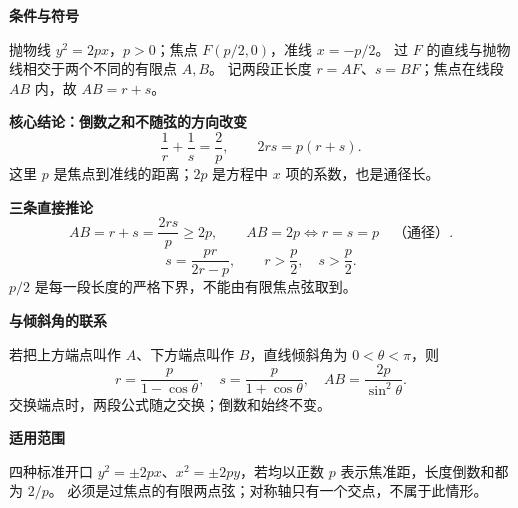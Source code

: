 \begin{statementbox}
\textbf{\textcolor{CStatement}{条件与符号}}

抛物线 $y^2=2px$，$p>0$；焦点 $F(p/2,0)$，准线 $x=-p/2$。
过 $F$ 的直线与抛物线相交于两个不同的有限点 $A,B$。
记两段正长度 $r=AF$、$s=BF$；焦点在线段 $AB$ 内，故 $AB=r+s$。

\par\medskip
\textbf{\textcolor{CStatement}{核心结论：倒数之和不随弦的方向改变}}
\[
 \boxed{\frac1r+\frac1s=\frac2p},\qquad
 \boxed{2rs=p(r+s)}.
\]
这里 $p$ 是焦点到准线的距离；$2p$ 是方程中 $x$ 项的系数，也是通径长。

\par\medskip
\textbf{\textcolor{CStatement}{三条直接推论}}
\[
 AB=r+s=\frac{2rs}{p}\ge2p,
 \qquad AB=2p\iff r=s=p\quad\text{（通径）}.
\]
\[
 \boxed{s=\frac{pr}{2r-p}},\qquad r>\frac p2,\quad s>\frac p2.
\]
$p/2$ 是每一段长度的严格下界，不能由有限焦点弦取到。

\par\medskip
\textbf{\textcolor{CStatement}{与倾斜角的联系}}

若把上方端点叫作 $A$、下方端点叫作 $B$，直线倾斜角为 $0<\theta<\pi$，则
\[
 r=\frac p{1-\cos\theta},\quad
 s=\frac p{1+\cos\theta},\quad
 AB=\frac{2p}{\sin^2\theta}.
\]
交换端点时，两段公式随之交换；倒数和始终不变。

\par\medskip
\textbf{\textcolor{CStatement}{适用范围}}

四种标准开口 $y^2=\pm2px$、$x^2=\pm2py$，若均以正数 $p$ 表示焦准距，长度倒数和都为 $2/p$。
必须是过焦点的有限两点弦；对称轴只有一个交点，不属于此情形。
\end{statementbox}
